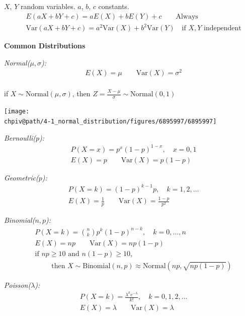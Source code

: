 \documentclass[8pt]{article}
\makeatletter
\def\chpiv@path{../../Chp 4}
\makeatother
\begin{document}
\begin{multicols}{2}
$X$, $Y$ random variables. $a$, $b$, $c$ constants.
\begin{align*}
    &E(aX + bY + c) = aE(X) + bE(Y) + c \qquad \text{Always} \\
    &\mathrm{Var}(aX + bY +c) = a^2\mathrm{Var}(X) + b^2\mathrm{Var}(Y) \quad \text{if } X, Y \text{ independent}
\end{align*}

\textbf{Common Distributions}

\textit{Normal($\mu,\sigma$):}
\begin{align*}
    &E(X) = \mu \qquad \mathrm{Var}(X) = \sigma^2 \\
\end{align*}

\vspace{-2em}
if $X \sim \text{Normal}(\mu, \sigma)$, then $Z = \frac{X - \mu}{\sigma} \sim \text{Normal}(0,1)$

\begin{center}
\texttt{[image: \\chpiv@path/4-1\_normal\_distribution/figures/6895997/6895997]}
\end{center}

\textit{Bernoulli($p$):}
\begin{align*}
    &P(X = x) = p^x (1-p)^{1-x},\quad x=0,1 \\
    &E(X) = p \qquad \mathrm{Var}(X) = p(1-p)
\end{align*}

\textit{Geometric($p$):}
\begin{align*}
    &P(X = k) = (1-p)^{k-1}p,\quad k=1,2,\ldots \\
    &E(X) = \frac{1}{p} \qquad \mathrm{Var}(X) = \frac{1-p}{p^2}
\end{align*}

\textit{Binomial($n,p$):}
\begin{align*}
    &P(X = k) = \binom{n}{k}p^k(1-p)^{n-k},\quad k=0,\ldots,n \\
    &E(X) = np \qquad \mathrm{Var}(X) = np(1-p)\\
    &\text{if } np \ge 10 \text{ and } n(1-p) \ge 10, \\
    &\hspace{2em}\text{ then } X \sim \text{Binomial}(n,p) \approx \text{Normal}(np, \sqrt{np(1-p)})
\end{align*}


\textit{Poisson($\lambda$):}
\begin{align*}
    &P(X = k) = \frac{\lambda^k e^{-\lambda}}{k!},\quad k=0,1,2,\ldots \\
    &E(X) = \lambda \qquad \mathrm{Var}(X) = \lambda
\end{align*}


\end{multicols} %
\end{document}
